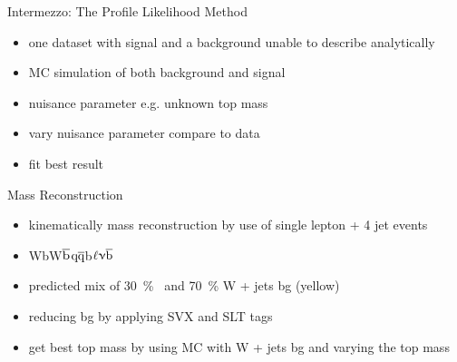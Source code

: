 \begin{frame}{Intermezzo: The Profile Likelihood Method}
	
	\begin{itemize}\itemfill
		\item one dataset with signal and a background \ra unable to describe analytically
		\item MC simulation of both background and signal
		\item nuisance parameter \ra e.g. unknown top mass
		\item vary nuisance parameter \ra compare to data
		\item fit best result
	\end{itemize}
	
	\begin{figure}\vspace*{-5pt}
		\centering
	\end{figure}\vspace*{-20pt}
	
\end{frame}
\begin{frame}{Mass Reconstruction}
	
	\begin{itemize}\itemfill
		\item kinematically mass reconstruction by use of single lepton + 4 jet events
		\item \ttb\ch{->}WbW$\overline{\text{b}}$\ch{->}$\text{q}\overline{\text{q}}$b$\ell\upnu\overline{\text{b}}$
		\item predicted mix of \SI{30}{\%} \ttb\ and \SI{70}{\%} W + jets bg (yellow)
		\item reducing bg by applying SVX and SLT tags
		\item get best top mass by using MC with W + jets bg and varying the top mass
	\end{itemize}
	
	\begin{figure}\vspace*{-5pt}
		\centering
	\end{figure}\vspace*{-20pt}
	
\end{frame}

